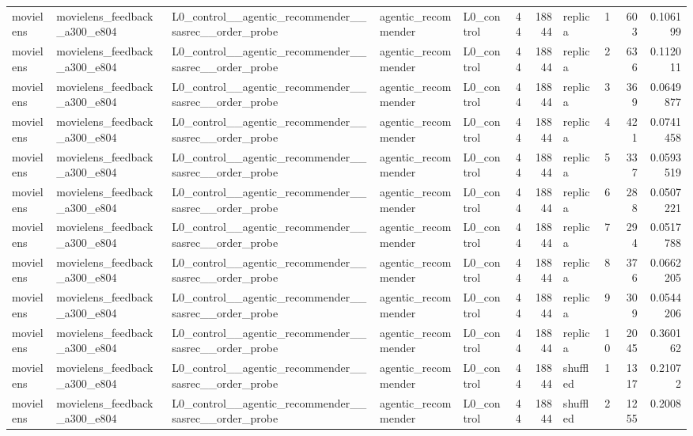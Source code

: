 \begin{table}[htbp!]
\begin{tabular}{lllllrrlrrr}
movielens & movielens\_feedback\_a300\_e804 & L0\_control\_\_agentic\_recommender\_\_sasrec\_\_order\_probe & agentic\_recommender & L0\_control & 44 & 18844 & replica & 1 & 603 & 0.106199 \\
movielens & movielens\_feedback\_a300\_e804 & L0\_control\_\_agentic\_recommender\_\_sasrec\_\_order\_probe & agentic\_recommender & L0\_control & 44 & 18844 & replica & 2 & 636 & 0.112011 \\
movielens & movielens\_feedback\_a300\_e804 & L0\_control\_\_agentic\_recommender\_\_sasrec\_\_order\_probe & agentic\_recommender & L0\_control & 44 & 18844 & replica & 3 & 369 & 0.0649877 \\
movielens & movielens\_feedback\_a300\_e804 & L0\_control\_\_agentic\_recommender\_\_sasrec\_\_order\_probe & agentic\_recommender & L0\_control & 44 & 18844 & replica & 4 & 421 & 0.0741458 \\
movielens & movielens\_feedback\_a300\_e804 & L0\_control\_\_agentic\_recommender\_\_sasrec\_\_order\_probe & agentic\_recommender & L0\_control & 44 & 18844 & replica & 5 & 337 & 0.0593519 \\
movielens & movielens\_feedback\_a300\_e804 & L0\_control\_\_agentic\_recommender\_\_sasrec\_\_order\_probe & agentic\_recommender & L0\_control & 44 & 18844 & replica & 6 & 288 & 0.0507221 \\
movielens & movielens\_feedback\_a300\_e804 & L0\_control\_\_agentic\_recommender\_\_sasrec\_\_order\_probe & agentic\_recommender & L0\_control & 44 & 18844 & replica & 7 & 294 & 0.0517788 \\
movielens & movielens\_feedback\_a300\_e804 & L0\_control\_\_agentic\_recommender\_\_sasrec\_\_order\_probe & agentic\_recommender & L0\_control & 44 & 18844 & replica & 8 & 376 & 0.0662205 \\
movielens & movielens\_feedback\_a300\_e804 & L0\_control\_\_agentic\_recommender\_\_sasrec\_\_order\_probe & agentic\_recommender & L0\_control & 44 & 18844 & replica & 9 & 309 & 0.0544206 \\
movielens & movielens\_feedback\_a300\_e804 & L0\_control\_\_agentic\_recommender\_\_sasrec\_\_order\_probe & agentic\_recommender & L0\_control & 44 & 18844 & replica & 10 & 2045 & 0.360162 \\
movielens & movielens\_feedback\_a300\_e804 & L0\_control\_\_agentic\_recommender\_\_sasrec\_\_order\_probe & agentic\_recommender & L0\_control & 44 & 18844 & shuffled & 1 & 1317 & 0.21072 \\
movielens & movielens\_feedback\_a300\_e804 & L0\_control\_\_agentic\_recommender\_\_sasrec\_\_order\_probe & agentic\_recommender & L0\_control & 44 & 18844 & shuffled & 2 & 1255 & 0.2008 \\

\end{tabular}
\end{table}
